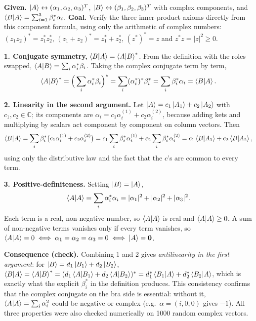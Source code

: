\documentclass[12pt]{article}
\newif\ifsolutions
\begin{document}
\ifsolutions
\begin{solutionbox}
\textbf{Given.} $\ket{A}\leftrightarrow(\alpha_1,\alpha_2,\alpha_3)^{T}$, $\ket{B}\leftrightarrow(\beta_1,\beta_2,\beta_3)^{T}$ with complex components, and $\braket{B|A}=\sum_{i=1}^{3}\beta_i^*\alpha_i$. \textbf{Goal.} Verify the three inner-product axioms directly from this component formula, using only the arithmetic of complex numbers: $(z_1z_2)^*=z_1^*z_2^*$, $(z_1+z_2)^*=z_1^*+z_2^*$, $(z^*)^*=z$ and $z^*z=|z|^2\ge0$.

\textbf{1. Conjugate symmetry,} $\braket{B|A}=\braket{A|B}^*$. From the definition with the roles swapped, $\braket{A|B}=\sum_i\alpha_i^*\beta_i$. Taking the complex conjugate term by term,
\[
\braket{A|B}^*=\Big(\sum_i\alpha_i^*\beta_i\Big)^*=\sum_i(\alpha_i^*)^*\beta_i^*=\sum_i\beta_i^*\alpha_i=\braket{B|A}.
\]

\textbf{2. Linearity in the second argument.} Let $\ket{A}=c_1\ket{A_1}+c_2\ket{A_2}$ with $c_1,c_2\in\mathbb{C}$; its components are $\alpha_i=c_1\alpha_i^{(1)}+c_2\alpha_i^{(2)}$, because adding kets and multiplying by scalars act component by component on column vectors. Then
\[
\braket{B|A}=\sum_i\beta_i^*\big(c_1\alpha_i^{(1)}+c_2\alpha_i^{(2)}\big)
=c_1\sum_i\beta_i^*\alpha_i^{(1)}+c_2\sum_i\beta_i^*\alpha_i^{(2)}
=c_1\braket{B|A_1}+c_2\braket{B|A_2},
\]
using only the distributive law and the fact that the $c$'s are common to every term.

\textbf{3. Positive-definiteness.} Setting $\ket{B}=\ket{A}$,
\[
\braket{A|A}=\sum_i\alpha_i^*\alpha_i=|\alpha_1|^2+|\alpha_2|^2+|\alpha_3|^2 .
\]
Each term is a real, non-negative number, so $\braket{A|A}$ is real and $\braket{A|A}\ge0$. A sum of non-negative terms vanishes only if every term vanishes, so $\braket{A|A}=0\iff\alpha_1=\alpha_2=\alpha_3=0\iff\ket{A}=\mathbf 0$.

\textbf{Consequence (check).} Combining 1 and 2 gives \emph{antilinearity in the first argument}: for $\ket{B}=d_1\ket{B_1}+d_2\ket{B_2}$, $\braket{B|A}=\braket{A|B}^*=(d_1\braket{A|B_1}+d_2\braket{A|B_2})^*=d_1^*\braket{B_1|A}+d_2^*\braket{B_2|A}$, which is exactly what the explicit $\beta_i^*$ in the definition produces. This consistency confirms that the complex conjugate on the bra side is essential: without it, $\braket{A|A}=\sum_i\alpha_i^2$ could be negative or complex (e.g.\ $\alpha=(i,0,0)$ gives $-1$). All three properties were also checked numerically on 1000 random complex vectors.
\end{solutionbox}
\end{document}
